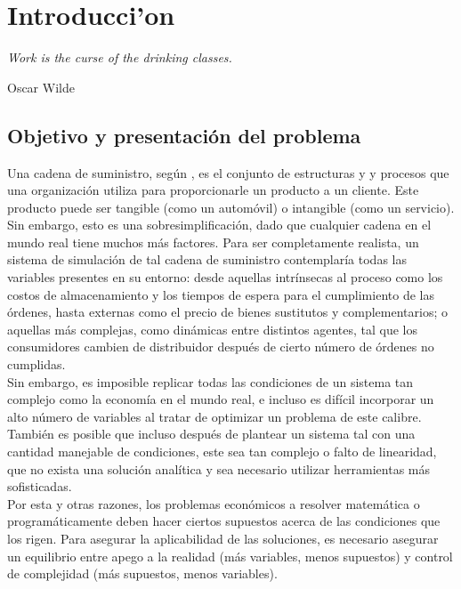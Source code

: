\chapter{Introducci'on}

\textit{Work is the curse of the drinking classes.}
\begin{flushright}
 Oscar Wilde
 \end{flushright}

\vspace{10 pt}

\section{Objetivo y presentaci\'on del problema}


Una cadena de suministro, seg\'un \citet{Sterman}, es el conjunto de estructuras y y procesos que una organizaci\'on utiliza para proporcionarle un producto a un cliente. Este producto puede ser tangible (como un autom\'ovil) o intangible (como un servicio). Sin embargo, esto es una sobresimplificaci\'on, dado que cualquier cadena en el mundo real tiene muchos m\'as factores. Para ser completamente realista, un sistema de simulaci\'on de tal cadena de suministro contemplar\'ia todas las variables presentes en su entorno: desde aquellas intr\'insecas al proceso como los costos de almacenamiento y los tiempos de espera para el cumplimiento de las \'ordenes, hasta externas como el precio de bienes sustitutos y complementarios; o aquellas m\'as complejas, como din\'amicas entre distintos agentes, tal que los consumidores cambien de distribuidor despu\'es de cierto n\'umero de \'ordenes no cumplidas.\\

Sin embargo, es imposible replicar todas las condiciones de un sistema tan complejo como la econom\'ia en el mundo real, e incluso es dif\'icil incorporar un alto n\'umero de variables al tratar de optimizar un problema de este calibre. Tambi\'en es posible que incluso despu\'es de plantear un sistema tal con una cantidad manejable de condiciones, este sea tan complejo o falto de linearidad, que no exista una soluci\'on anal\'itica y sea necesario utilizar herramientas m\'as sofisticadas.\\

Por esta y otras razones, los problemas econ\'omicos a resolver matem\'atica o program\'aticamente deben hacer ciertos supuestos acerca de las condiciones que los rigen. Para asegurar la aplicabilidad de las soluciones, es necesario asegurar un equilibrio entre apego a la realidad (m\'as variables, menos supuestos) y control de complejidad (m\'as supuestos, menos variables).\\

